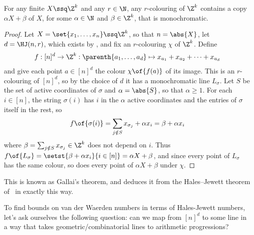 \begin{boxtheorem}
    For any finite $X \ssq \Z^k$ and any $r \in \N$, any $r$-colouring of $\Z^k$ contains a copy $\alpha X + \beta$ of $X$, for some $\alpha \in \N$ and $\beta \in \Z^k$, that is monochromatic.
\end{boxtheorem}
\begin{proof}
    Let $X = \set{x_1, \ldots, x_n} \ssq \Z^k$, so that $n = \abs{X}$, let $d = \HJ(n, r)$, which exists by , and fix an $r$-colouring $\chi$ of $\Z^k$. Define
    \begin{align*}
        f : [n]^d \to \Z^k : \parenth{a_1, \ldots, a_d} \mapsto x_{a_1} + x_{a_2} + \cdots + x_{a_d}
    \end{align*}
    and give each point $a \in [n]^d$ the colour $\chi\of{f(a)}$ of its image. This is an $r$-colouring of $[n]^d$, so by the choice of $d$ it has a monochromatic line $L_\sigma$. Let $S$ be the set of active coordinates of $\sigma$ and $\alpha = \abs{S}$, so that $\alpha \geq 1$. For each $i \in [n]$, the string $\sigma(i)$ has $i$ in the $\alpha$ active coordinates and the entries of $\sigma$ itself in the rest, so
    \begin{align*}
        f\of{\sigma(i)} = \sum_{j \notin S} x_{\sigma_j} + \alpha x_i = \beta + \alpha x_i
    \end{align*}
    where $\beta = \sum_{j \notin S} x_{\sigma_j} \in \Z^k$ does not depend on $i$. Thus $f\of{L_\sigma} = \setst{\beta + \alpha x_i}{i \in [n]} = \alpha X + \beta$, and since every point of $L_\sigma$ has the same colour, so does every point of $\alpha X + \beta$ under $\chi$.
\end{proof}

This is known as Gallai's theorem, and \cite[Chapter~2]{GrahamRothschildSpencer} deduces it from the Hales--Jewett theorem of~\cite{HalesJewett} in exactly this way.

To find bounds on van der Waerden numbers in terms of Hales-Jewett numbers, let's ask ourselves the following question: can we map from $[n]^d$ to some line in a way that takes geometric/combinatorial lines to arithmetic progressions?

